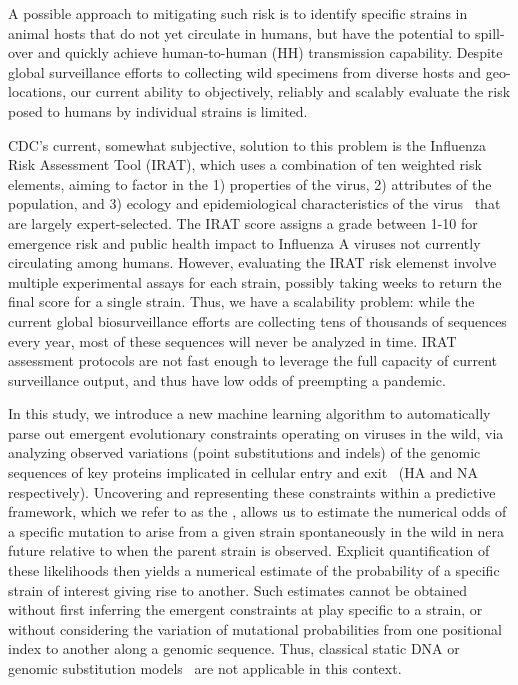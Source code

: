 \documentclass[onecolumn, compsoc,10pt]{IEEEtran}
\begin{document}
A possible approach to mitigating such risk is to identify specific strains in animal hosts that do not yet circulate in humans, but   have the potential to spill-over and quickly achieve human-to-human (HH) transmission capability. Despite global surveillance efforts to  collecting wild specimens from diverse hosts and geo-locations, our  current ability to objectively, reliably and scalably  evaluate the risk posed to  humans by  individual strains  is limited.

CDC's current, somewhat subjective, solution to this problem is the Influenza Risk Assessment Tool (IRAT), which  uses a combination of ten weighted risk elements, aiming to factor in the   1) properties of the virus, 2) attributes of the population, and 3) ecology and epidemiological characteristics of the virus~\cite{Influenz24:online} that are largely  expert-selected. The IRAT score assigns  a grade between 1-10 for emergence risk and public health impact to Influenza A viruses not currently circulating among humans. However, evaluating the IRAT risk elemenst  involve multiple experimental assays for each strain, possibly taking  weeks to return the final   score for a single strain. Thus, we have a scalability problem: while  the current global biosurveillance efforts are collecting tens of thousands of sequences every year, most of these sequences will never be analyzed in time. IRAT assessment protocols are  not fast enough to leverage the full capacity of current surveillance output, and thus have low odds of  preempting a pandemic.

In this study, we introduce a new machine learning algorithm to automatically parse out emergent evolutionary constraints operating on \infl viruses in the wild, via analyzing observed variations (point substitutions and indels) of the  genomic sequences  of key proteins implicated  in cellular entry and exit~\cite{gamblin2010influenza} (HA and NA respectively). Uncovering and representing these constraints within a predictive framework, which we refer to as the \enet, allows us to estimate the numerical odds of a specific mutation to arise from a given strain  spontaneously in the wild in nera future relative to when the parent strain is observed. Explicit quantification of these likelihoods then yields a numerical estimate of the probability of a specific strain of interest giving rise to another. Such estimates cannot be obtained without first inferring the emergent constraints at play specific to a strain,  or without considering the variation of mutational probabilities from one positional index to another along a genomic sequence. Thus, classical  static DNA or genomic substitution models~\cite{posada1998modeltest} are not applicable in this context.  
\end{document}
